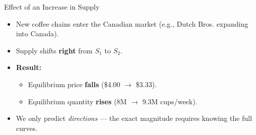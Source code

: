 \documentclass[aspectratio=169]{beamer}
\begin{document}
\begin{frame}{Effect of an Increase in Supply}
\transfade
\begin{itemize}[<+->]
  \item New coffee chains enter the Canadian market (e.g., Dutch Bros. expanding into Canada).
  \item Supply shifts \textbf{right} from $S_1$ to $S_2$.
  \item \textbf{Result:}
  \begin{itemize}[<+->]
    \item Equilibrium price \textbf{falls} (\$4.00 $\to$ \$3.33).
    \item Equilibrium quantity \textbf{rises} (8M $\to$ 9.3M cups/week).
  \end{itemize}
  \item We only predict \emph{directions} --- the exact magnitude requires knowing the full curves.
\end{itemize}
\end{frame}
\end{document}
